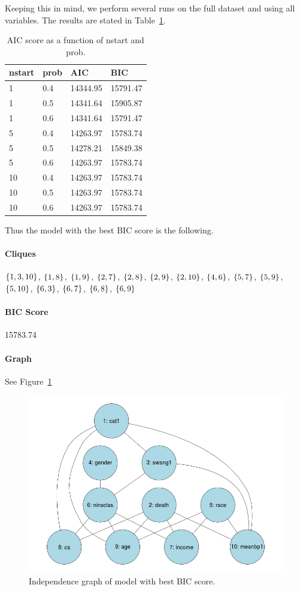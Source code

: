 \documentclass[12pt]{article}
\theoremstyle{definition}
\begin{document}
Keeping this in mind, we perform several runs on the full dataset and using all variables.
The results are stated in Table~\ref{table1}.

\begin{table}[H]
\centering
\begin{tabular}{llll}
    nstart & prob & AIC & BIC \\
    \hline \hline
    1 & 0.4 & 14344.95 & 15791.47 \\
    1 & 0.5 & 14341.64 & 15905.87 \\
    1 & 0.6 & 14341.64 & 15791.47 \\
    5 & 0.4 & 14263.97 & 15783.74 \\
    5 & 0.5 & 14278.21 & 15849.38 \\
    5 & 0.6 & 14263.97 & 15783.74 \\
    10 & 0.4 & 14263.97 & 15783.74 \\
    10 & 0.5 & 14263.97 & 15783.74 \\
    10 & 0.6 & 14263.97 & 15783.74 \\
\end{tabular}
\caption{AIC score as a function of nstart and prob.}
\label{table1}
\end{table}

Thus the model with the best BIC score is the following.
\paragraph{Cliques}
$\set{1,3,10}$, $\set{1,8}$, $\set{1,9}$, $\set{2,7}$, $\set{2,8}$, $\set{2,9}$,
$\set{2,10}$, $\set{4,6}$, $\set{5,7}$, $\set{5,9}$, $\set{5,10}$, $\set{6,3}$,
$\set{6,7}$, $\set{6,8}$, $\set{6,9}$

\paragraph{BIC Score} 15783.74

\paragraph{Graph} See Figure~\ref{fig:best}

\begin{figure}[H]
    \centering
    \includegraphics[width=0.8\linewidth]{best.png}
    \caption{Independence graph of model with best BIC score.}
\label{fig:best}
\end{figure}
\end{document}
